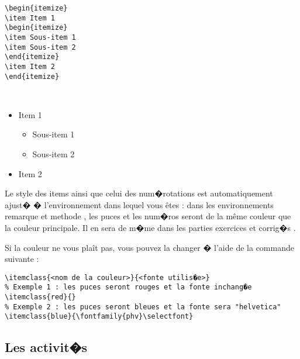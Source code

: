 \documentclass[ams,openany,10pt,presentation,latin1]{mathbook}
\begin{document}
\begin{minipage}{0.4\linewidth}
\begin{lstlisting}
\begin{itemize}
\item Item 1
\begin{itemize}
\item Sous-item 1
\item Sous-item 2
\end{itemize}
\item Item 2
\end{itemize}
\end{lstlisting}
\end{minipage}
\begin{minipage}{0.05\linewidth}
~\par
\end{minipage}
\begin{minipage}{0.4\linewidth}
\begin{itemize}
\item Item 1
\begin{itemize}
\item Sous-item 1
\item Sous-item 2
\end{itemize}
\item Item 2
\end{itemize}
\end{minipage}

\medskip

Le style des items ainsi que celui des num�rotations est automatiquement ajust� � l'environnement dans lequel vous \^etes : dans les environnements \og remarque \fg{} et \og methode \fg, les puces et les num�ros seront de la m\^eme couleur que la couleur principale. Il en sera de m�me dans les parties \og exercices \fg{} et \og corrig�s \fg.

\medskip

Si la couleur ne vous pla\^it pas, vous pouvez la changer � l'aide de la commande suivante :

\medskip

\begin{lstlisting}
\itemclass{<nom de la couleur>}{<fonte utilis�e>}
% Exemple 1 : les puces seront rouges et la fonte inchang�e
\itemclass{red}{}
% Exemple 2 : les puces seront bleues et la fonte sera "helvetica"
\itemclass{blue}{\fontfamily{phv}\selectfont}
\end{lstlisting}

\subsection{Les activit�s}
\end{document}
